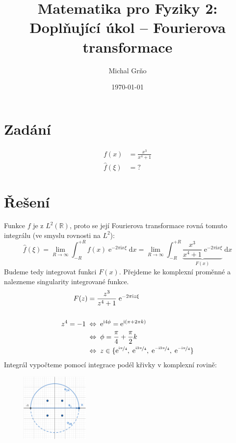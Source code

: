 \documentclass[10pt,a4paper]{article}
\newcommand{\const}[1]{\text{#1}}
\renewcommand{\d}[1]{\;\const{d}#1}
\newcommand{\e}[1]{\const{e}^{#1}}
\renewcommand{\i}{\const{i}}
\begin{document}
\title{Matematika pro Fyziky 2: \\ Doplňující úkol – Fourierova transformace}
\author{Michal Grňo}
\date{\today}

\maketitle

\section{Zadání}
\begin{align*}
    f(x) &= \frac{x^3}{x^4 + 1} \\[5pt]
    \hat{f}(\xi) &= ?
\end{align*}

\section{Řešení}
Funkce $f$ je z $L^2(\mathbb{R})$, proto se její Fourierova transformace rovná tomuto integrálu (ve smyslu rovnosti na $L^2$):
\begin{equation*}
    \hat{f}(\xi)
    = \lim_{R\to\infty} \int_{-R}^{+R} f(x) \; \e{-2\pi\i x\xi} \d{x}
    = \lim_{R\to\infty} \int_{-R}^{+R} \underbrace{\frac{x^3}{x^4 + 1} \; \e{-2\pi\i x\xi}}_{F(x)} \d{x}
\end{equation*}
Budeme tedy integrovat funkci $F(x)$. Přejdeme ke komplexní proměnné a nalezneme singularity integrované funkce.
\begin{align*}
    F(z) &= \frac{z^3}{z^4 + 1} \; \e{-2\pi\i z\xi}
    \\
    \\
    z^4 = -1
    \;&\Leftrightarrow\;
    \e{\i4\phi} = \e{\i(\pi + 2\pi k)} \\
    &\Leftrightarrow\;
    \phi = \frac{\pi}{4} + \frac{\pi}{2} k \\
    &\Leftrightarrow\;
    z \in \{
        \e{\nicefrac{\i\pi}{4}}, \;
        \e{\nicefrac{\i 3\pi}{4}}, \;
        \e{\nicefrac{-\i 3\pi}{4}}, \;
        \e{\nicefrac{-\i\pi}{4}}
    \}
\end{align*}
Integrál vypočteme pomocí integrace podél křivky v komplexní rovině:
\begin{figure}[H]
    \centering
    \includegraphics[width=0.3\textwidth]{fourierparam.pdf}
\end{figure}
\end{document}
